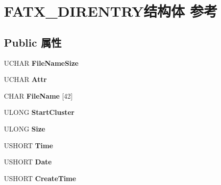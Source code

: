 \hypertarget{struct_f_a_t_x___d_i_r_e_n_t_r_y}{}\section{F\+A\+T\+X\+\_\+\+D\+I\+R\+E\+N\+T\+R\+Y结构体 参考}
\label{struct_f_a_t_x___d_i_r_e_n_t_r_y}
\subsection*{Public 属性}
\begin{DoxyCompactItemize}
\item 
\mbox{\label{struct_f_a_t_x___d_i_r_e_n_t_r_y_aca05b6c3e54d4e265ed329bd5b327e7c}} 
U\+C\+H\+AR {\bfseries File\+Name\+Size}
\item 
\mbox{\label{struct_f_a_t_x___d_i_r_e_n_t_r_y_ad36151701bf9fd2ec7e5d51a0826773f}} 
U\+C\+H\+AR {\bfseries Attr}
\item 
\mbox{\label{struct_f_a_t_x___d_i_r_e_n_t_r_y_ad7279f36bf407596c689bacf65394071}} 
C\+H\+AR {\bfseries File\+Name} \mbox{[}42\mbox{]}
\item 
\mbox{\label{struct_f_a_t_x___d_i_r_e_n_t_r_y_a010896c52ce9b523c0871451f9e4f2e7}} 
U\+L\+O\+NG {\bfseries Start\+Cluster}
\item 
\mbox{\label{struct_f_a_t_x___d_i_r_e_n_t_r_y_a861b6f577b70eaf4670a8a08f7444711}} 
U\+L\+O\+NG {\bfseries Size}
\item 
\mbox{\label{struct_f_a_t_x___d_i_r_e_n_t_r_y_a0a54f73979a908300148dde1617c0003}} 
U\+S\+H\+O\+RT {\bfseries Time}
\item 
\mbox{\label{struct_f_a_t_x___d_i_r_e_n_t_r_y_a06d6ba08db6dbfc1665d6dc775323aa4}} 
U\+S\+H\+O\+RT {\bfseries Date}
\item 
\mbox{\label{struct_f_a_t_x___d_i_r_e_n_t_r_y_ac3cff128dac75195ca53fce388dfd94f}} 
U\+S\+H\+O\+RT {\bfseries Create\+Time}

\end{DoxyCompactItemize}
